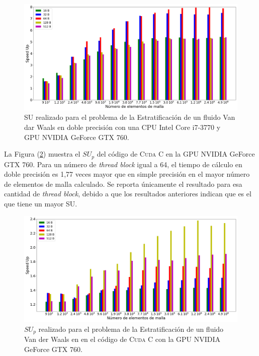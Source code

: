\begin{figure}[htbp]
	\centering
	\includegraphics[width=\textwidth]{figs_2/cap4/s_760_VdW_double_10}
	\caption{SU realizado para el problema de la Estratificación de un fluido Van dar Waals en doble precisión con una CPU Intel Core i7-3770 y GPU NVIDIA GeForce GTX 760.} 
	\label{fig:s_760_VdW_double_10}	
\end{figure}

La Figura (\ref{fig:c_760_VdW_cuda_10}) muestra el ${SU}_p$ del código de \textsc{Cuda C} en la GPU NVIDIA GeForce GTX 760. Para un número de \textit{thread block} igual a 64, el tiempo de cálculo en doble precisión es 1,77 veces mayor que en simple precisión en el mayor número de elementos de malla calculado. Se reporta únicamente el resultado para esa cantidad de \textit{thread block}, debido a que los resultados anteriores indican que es el que tiene un mayor SU.

\begin{figure}[H]
	\centering
	\includegraphics[width=\textwidth]{figs_2/cap4/c_760_MxC_cuda_10}
	\caption{$SU_p$ realizado para el problema de la Estratificación de un fluido Van der Waals en en el código de \textsc{Cuda C} con la GPU NVIDIA GeForce GTX 760.} 
	\label{fig:c_760_VdW_cuda_10}	
\end{figure}

